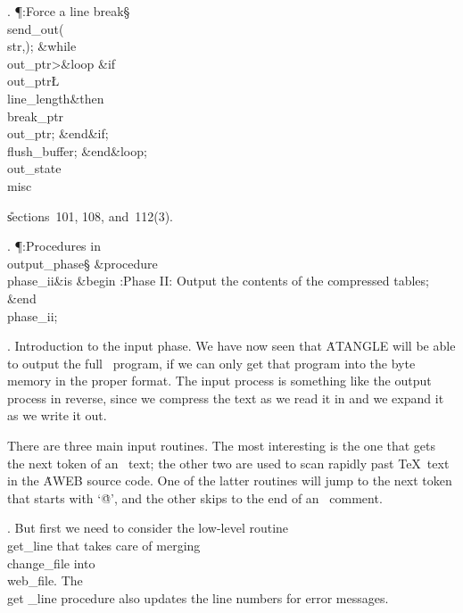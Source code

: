 . \P\?:Force a line break\X\S\?\6
\\{send\_out}\?\1(\?\\{str}\?,\?\2)\?;\6
\1\&{while}\8\\{out\_ptr}\?>\8\&{loop}\6
\&{if}\1\1\8\\{out\_ptr}\?\L\?\\{line\_length}\2\8\&{then}\6
\\{break\_ptr}\?\K\?\\{out\_ptr};\2\6
\&{end}\8\2\&{if}\1;\6
\\{flush\_buffer};\2\6
\&{end}\8\&{loop};\6
\\{out\_state}\?\K\?\\{misc}\par
\U sections~101, 108, and~112(3).\fi

. \P\?:Procedures in \\{output\_phase}\X\mathrel{+}\S\?\6
\&{procedure}\8\1\\{phase\_ii}\2\8\&{is}\8\1\6
\4\&{begin}\6
:Phase II: Output the contents of the compressed tables\X;\2\6
\&{end}\8\\{phase\_ii};\par
\fi

.  Introduction to the input phase.
We have now seen that \.{ATANGLE} will be able to output the full
\ADA\ program, if we can only get that program into the byte memory in
the proper format. The input process is something like the output process
in reverse, since we compress the text as we read it in and we expand it
as we write it out.

There are three main input routines. The most interesting is the one that
gets the next token of an \ADA\ text; the other two are used to scan rapidly
past \TeX\ text in the \.{AWEB} source code. One of the latter routines will
jump to the next token that starts with `\.{@}', and the other skips to the
end of an \ADA\ comment.

\fi

. But first we need to consider the low-level routine \\{get\_line}
that takes care of merging \\{change\_file} into \\{web\_file}. The \\{get%
\_line}
procedure also updates the line numbers for error messages.

